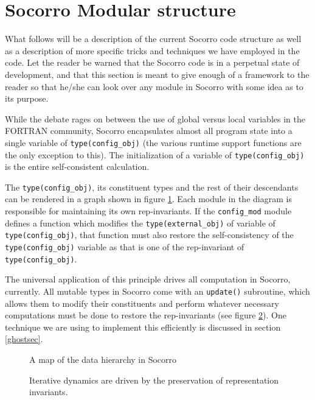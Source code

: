 \section{Socorro Modular structure}

What follows will be a description of the current Socorro code
structure as well as a description of more specific tricks and
techniques we have employed in the code.  Let the reader be warned
that the Socorro code is in a perpetual state of development, and
that this section is meant to give enough of a framework
to the reader so that he/she can look over any module in Socorro
with some idea as to its purpose.

While the debate rages on between the use of global versus local
variables in the FORTRAN community, Socorro encapsulates almost all
program state into a single variable of \verb+type(config_obj)+ (the
various runtime support functions are the only exception to this).
The initialization of a variable of \verb+type(config_obj)+
is the entire self-consistent calculation.

The \verb+type(config_obj)+, its constituent types and the rest of
their descendants can be rendered in a graph shown in figure
\ref{datafig}.  Each module in the diagram is responsible for
maintaining its own rep-invariants.  If the \verb+config_mod+
module defines a function which modifies the \verb+type(external_obj)+
of variable of \verb+type(config_obj)+, that function must also
restore the self-consistency of the \verb+type(config_obj)+ variable
as that is one of the rep-invariant of \verb+type(config_obj)+.

The universal application of this principle drives all computation
in Socorro, currently.  All mutable types in Socorro
come with an \verb+update()+ subroutine, which allows them to
modify their constituents and perform whatever necessary computations
must be done to restore the rep-invariants (see figure \ref{modifyfig}).
One technique we are using to implement this efficiently is
discussed in section \ref{ghostsec}.

\begin{figure}
\begin{center}
\caption{A map of the data hierarchy in Socorro}
\label{datafig}
\end{center}
\end{figure}

\begin{figure}
\begin{center}
\caption{Iterative dynamics are driven by the preservation of representation
invariants.}
\label{modifyfig}
\end{center}
\end{figure}

